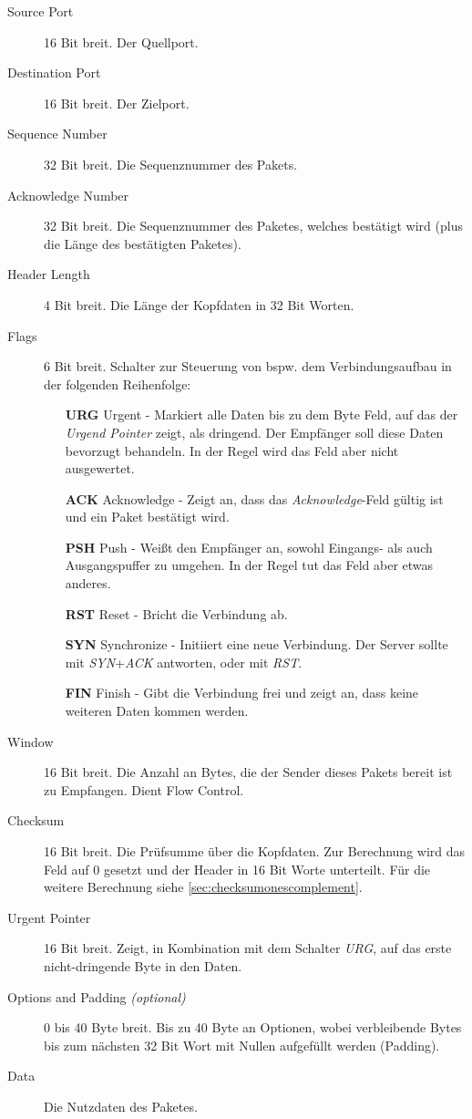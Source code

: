 			\begin{description}
				\item[Source Port] 16 Bit breit. Der Quellport.
				\item[Destination Port] 16 Bit breit. Der Zielport.
				\item[Sequence Number] 32 Bit breit. Die Sequenznummer des Pakets.
				\item[Acknowledge Number] 32 Bit breit. Die Sequenznummer des Paketes, welches bestätigt wird (plus die Länge des bestätigten Paketes).
				\item[Header Length] 4 Bit breit. Die Länge der Kopfdaten in 32 Bit Worten.
				\item[Flags] 6 Bit breit. Schalter zur Steuerung von bspw. dem Verbindungsaufbau in der folgenden Reihenfolge:
					\begin{itemize}
						\item[\textbf{URG}] Urgent - Markiert alle Daten bis zu dem Byte Feld, auf das der \textit{Urgend Pointer} zeigt, als dringend. Der Empfänger soll diese Daten bevorzugt behandeln. In der Regel wird das Feld aber nicht ausgewertet.
						\item[\textbf{ACK}] Acknowledge - Zeigt an, dass das \textit{Acknowledge}-Feld gültig ist und ein Paket bestätigt wird.
						\item[\textbf{PSH}] Push - Weißt den Empfänger an, sowohl Eingangs- als auch Ausgangspuffer zu umgehen. In der Regel tut das Feld aber etwas anderes.
						\item[\textbf{RST}] Reset - Bricht die Verbindung ab.
						\item[\textbf{SYN}] Synchronize - Initiiert eine neue Verbindung. Der Server sollte mit \textit{SYN}+\textit{ACK} antworten, oder mit \textit{RST}.
						\item[\textbf{FIN}] Finish - Gibt die Verbindung frei und zeigt an, dass keine weiteren Daten kommen werden.
					\end{itemize}
				\item[Window] 16 Bit breit. Die Anzahl an Bytes, die der Sender dieses Pakets bereit ist zu Empfangen. Dient Flow Control.
				\item[Checksum] 16 Bit breit. Die Prüfsumme über die Kopfdaten. Zur Berechnung wird das Feld auf 0 gesetzt und der Header in 16 Bit Worte unterteilt. Für die weitere Berechnung siehe \ref{sec:checksumonescomplement}.
				\item[Urgent Pointer] 16 Bit breit. Zeigt, in Kombination mit dem Schalter \textit{URG}, auf das erste nicht-dringende Byte in den Daten.
				\item[Options and Padding \textit{(optional)}] 0 bis 40 Byte breit. Bis zu 40 Byte an Optionen, wobei verbleibende Bytes bis zum nächsten 32 Bit Wort mit Nullen aufgefüllt werden (Padding).
				\item[Data] Die Nutzdaten des Paketes.
			\end{description}

